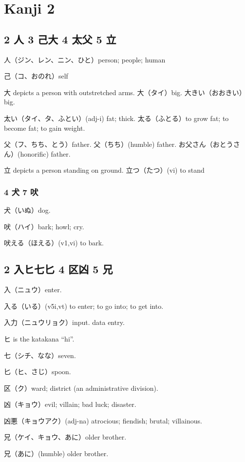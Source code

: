 \chapter{Kanji 2}

\section{2 人 3 己大 4 太父 5 立}

人（ジン、レン、ニン、ひと）person; people; human

己（コ、おのれ）self

大 depicts a person with outstretched arms.
大（タイ）big.
大きい（おおきい）big.

太い（タイ、タ、ふとい）(adj-i) fat; thick.
太る（ふとる）to grow fat; to become fat; to gain weight.

父（フ、ちち、とう）father.
父（ちち）(humble) father.
お父さん（おとうさん）(honorific) father.

立 depicts a person standing on ground.
立つ（たつ）(vi) to stand

\subsection{4 犬 7 吠}

犬（いぬ）dog.

吠（ハイ）bark; howl; cry.

吠える（ほえる）(v1,vi) to bark.

\section{2 入ヒ七匕 4 区凶 5 兄}

入（ニュウ）enter.

入る（いる）(v5i,vt)
to enter; to go into; to get into.

入力（ニュウリョク）input. data entry.

ヒ is the katakana ``hi''.

七（シチ、なな）seven.

匕（ヒ、さじ）spoon.

区（ク）ward; district (an administrative division).

凶（キョウ）evil; villain; bad luck; disaster.

凶悪（キョウアク）(adj-na) atrocious; fiendish; brutal; villainous.

兄（ケイ、キョウ、あに）older brother.

兄（あに）(humble) older brother.

